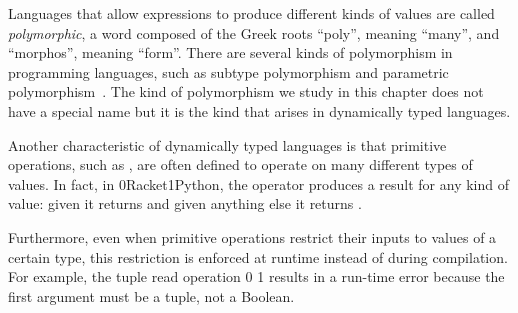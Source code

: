 \documentclass[7x10,nocrop]{TimesAPriori_MIT}%
\def\racketEd{0}
\def\pythonEd{1}
\def\edition{0}
\newcommand{\racket}[1]{{\if\edition\racketEd{#1}\fi}}
\newcommand{\python}[1]{{\if\edition\pythonEd #1\fi}}
\begin{document}
Languages that allow expressions to produce different kinds of values
are called \emph{polymorphic}, a word composed of the Greek roots
``poly'', meaning ``many'', and ``morphos'', meaning ``form''.  There
are several kinds of polymorphism in programming languages, such as
subtype polymorphism and parametric
polymorphism~\citep{Cardelli:1985kx}. The kind of polymorphism we
study in this chapter does not have a special name but it is the kind
that arises in dynamically typed languages.

Another characteristic of dynamically typed languages is that
primitive operations, such as , are often defined to operate
on many different types of values.  In fact, in
\racket{Racket}\python{Python}, the  operator produces a
result for any kind of value: given \FALSE{} it returns \TRUE{} and
given anything else it returns \FALSE{}.

Furthermore, even when primitive operations restrict their inputs to
values of a certain type, this restriction is enforced at runtime
instead of during compilation. For example, the tuple read
operation
\racket{}
\python{}
results in a run-time error because the first argument must
be a tuple, not a Boolean.
\end{document}
